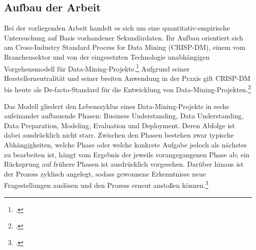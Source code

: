 \documentclass[12pt,a4paper]{article}
\begin{document}
\subsection{Aufbau der Arbeit}
%
%
%
Bei der vorliegenden Arbeit handelt es sich um eine quantitativ-empirische Untersuchung auf Basis
vorhandener Sekundärdaten. Ihr Aufbau orientiert sich am Cross-Industry Standard Process for Data
Mining (CRISP-DM), einem vom Branchensektor und von der eingesetzten Technologie unabhängigen
Vorgehensmodell für Data-Mining-Projekte.\footcite{Wirth2000} Aufgrund seiner Herstellerneutralität
und seiner breiten Anwendung in der Praxis gilt CRISP-DM bis heute als De-facto-Standard für die
Entwicklung von Data-Mining-Projekten.\footcite[??]{Schroeer2021}

Das Modell gliedert den Lebenszyklus eines Data-Mining-Projekts in sechs aufeinander aufbauende
Phasen: Business Understanding, Data Understanding, Data Preparation, Modeling, Evaluation und
Deployment. Deren Abfolge ist dabei ausdrücklich nicht starr. Zwischen den Phasen bestehen zwar
typische Abhängigkeiten, welche Phase oder welche konkrete Aufgabe jedoch als nächstes zu
bearbeiten ist, hängt vom Ergebnis der jeweils vorangegangenen Phase ab; ein Rücksprung auf frühere
Phasen ist ausdrücklich vorgesehen. Darüber hinaus ist der Prozess zyklisch angelegt, sodass
gewonnene Erkenntnisse neue Fragestellungen auslösen und den Prozess erneut anstoßen
können.\footcite{Wirth2000}
\end{document}
